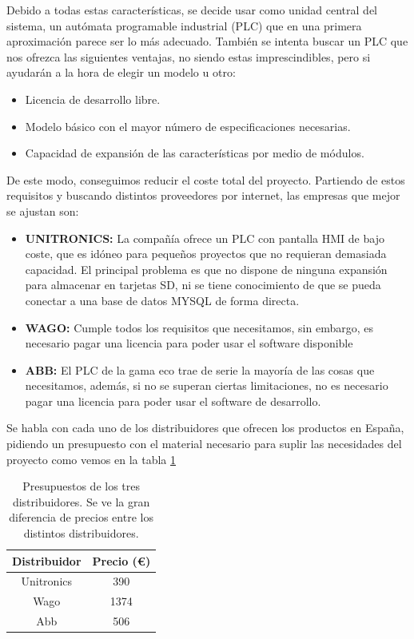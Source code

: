 Debido a todas estas características, se decide usar como unidad central del sistema, un autómata programable industrial (PLC) que en una primera aproximación parece ser lo más adecuado. También se intenta buscar un PLC que nos ofrezca las siguientes ventajas, no siendo estas imprescindibles, pero si ayudarán a la hora de elegir un modelo u otro:

\begin{itemize}
		\item{Licencia de desarrollo libre.}
		\item{Modelo básico con el mayor número de especificaciones necesarias.}
		\item{Capacidad de expansión de las características por medio de módulos.}
\end{itemize}

De este modo, conseguimos reducir el coste total del proyecto. Partiendo de estos requisitos y buscando distintos proveedores por internet, las empresas que mejor se ajustan son:

\begin{itemize}
		\item{\textbf{UNITRONICS:} La compañía ofrece un PLC con pantalla HMI de bajo coste, que es idóneo para pequeños proyectos que no requieran demasiada capacidad. El principal problema es que no dispone de ninguna expansión para almacenar en tarjetas SD, ni se tiene conocimiento de que se pueda conectar a una base de datos MYSQL de forma directa.}
		\item{\textbf{WAGO:} Cumple todos los requisitos que necesitamos, sin embargo, es necesario pagar una licencia para poder usar el software disponible}
		\item{\textbf{ABB:} El PLC de la gama eco trae de serie la mayoría de las cosas que necesitamos, además, si no se superan ciertas limitaciones, no es necesario pagar una licencia para poder usar el software de desarrollo.}
\end{itemize}

Se habla con cada uno de los distribuidores que ofrecen los productos en España, pidiendo un presupuesto con el material necesario para suplir las necesidades del proyecto como vemos en la tabla \ref{tab:presupuestos}

\begin{table}[H]
	\centering
	\begin{tabular}{cc}
		{\bf Distribuidor} & {\bf Precio (\euro{})} \\ \hline
		Unitronics         & 390              \\
		Wago               & 1374             \\
		Abb                & 506              \\
	\end{tabular}
	\caption[Presupuesto de los tres distribuidores]{Presupuestos de los tres distribuidores. Se ve la gran diferencia de precios entre los distintos distribuidores.}
	\label{tab:presupuestos}
\end{table}

